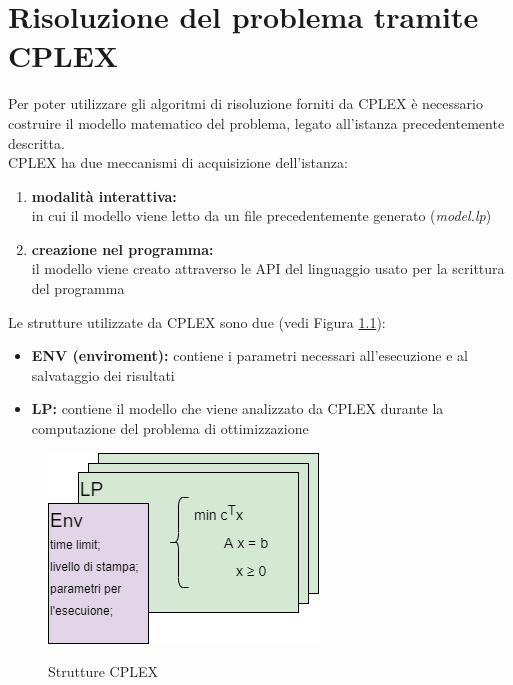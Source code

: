 \chapter{Risoluzione del problema tramite CPLEX}
Per poter utilizzare gli algoritmi di risoluzione forniti da CPLEX è necessario costruire il modello matematico del problema, legato all'istanza precedentemente descritta.\\
CPLEX ha due meccanismi di acquisizione dell'istanza:
\begin{enumerate}
\item{\textbf{modalità interattiva:}\\
in cui il modello viene letto da un file precedentemente generato (\textit{model.lp})}
\item{\textbf{creazione nel programma:}\\
il modello viene creato attraverso le API del linguaggio usato per la scrittura del programma}
\end{enumerate}

Le strutture utilizzate da CPLEX sono due (vedi Figura \ref{strutture_cplex}):
\begin{itemize}
\item{\textbf{ENV (enviroment):} contiene i parametri necessari all'esecuzione e al salvataggio dei risultati}
\item{\textbf{LP:} contiene il modello che viene analizzato da CPLEX durante la computazione del problema di ottimizzazione}
\end{itemize}

\begin{figure}[h] 
\begin{center} 
  \includegraphics[scale=0.5]{Images/cplex_structs}\\ 
  \caption{\footnotesize{Strutture CPLEX}}
  \label{strutture_cplex} 
\end{center} 
\end{figure}

